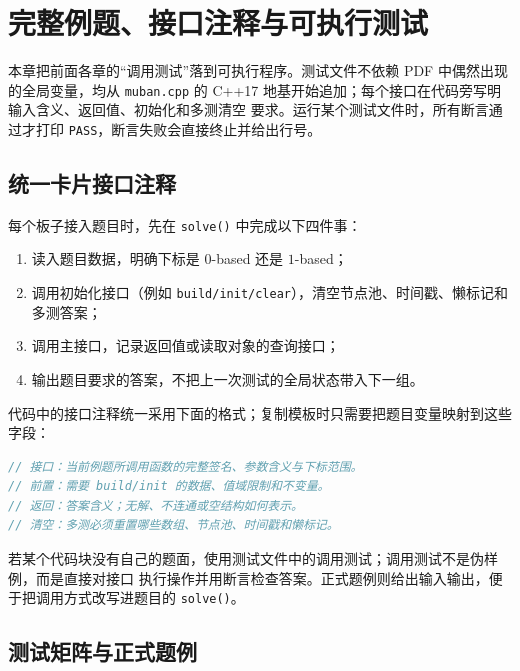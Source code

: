 \chapter{完整例题、接口注释与可执行测试}

本章把前面各章的“调用测试”落到可执行程序。测试文件不依赖 PDF 中偶然出现的全局变量，均从
\texttt{muban.cpp} 的 C++17 地基开始追加；每个接口在代码旁写明输入含义、返回值、初始化和多测清空
要求。运行某个测试文件时，所有断言通过才打印 \texttt{PASS}，断言失败会直接终止并给出行号。

\section{统一卡片接口注释}

每个板子接入题目时，先在 \texttt{solve()} 中完成以下四件事：

\begin{enumerate}
\item 读入题目数据，明确下标是 \(0\)-based 还是 \(1\)-based；
\item 调用初始化接口（例如 \texttt{build/init/clear}），清空节点池、时间戳、懒标记和多测答案；
\item 调用主接口，记录返回值或读取对象的查询接口；
\item 输出题目要求的答案，不把上一次测试的全局状态带入下一组。
\end{enumerate}

代码中的接口注释统一采用下面的格式；复制模板时只需要把题目变量映射到这些字段：

\begin{lstlisting}[language={C++}]
// 接口：当前例题所调用函数的完整签名、参数含义与下标范围。
// 前置：需要 build/init 的数据、值域限制和不变量。
// 返回：答案含义；无解、不连通或空结构如何表示。
// 清空：多测必须重置哪些数组、节点池、时间戳和懒标记。
\end{lstlisting}

若某个代码块没有自己的题面，使用测试文件中的调用测试；调用测试不是伪样例，而是直接对接口
执行操作并用断言检查答案。正式题例则给出输入输出，便于把调用方式改写进题目的
\texttt{solve()}。

\section{测试矩阵与正式题例}

